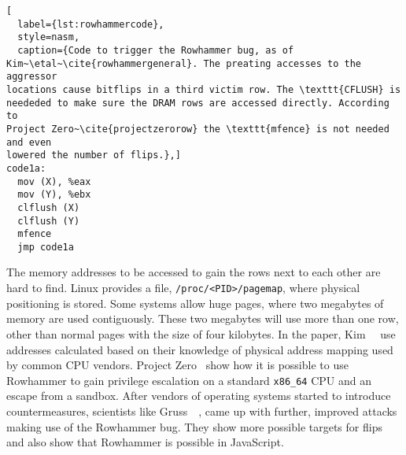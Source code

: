 \begin{minipage}{\linewidth}
\begin{lstlisting}[
  label={lst:rowhammercode},
  style=nasm,
  caption={Code to trigger the Rowhammer bug, as of
Kim~\etal~\cite{rowhammergeneral}. The preating accesses to the aggressor
locations cause bitflips in a third victim row. The \texttt{CFLUSH} is
neededed to make sure the DRAM rows are accessed directly. According to
Project Zero~\cite{projectzerorow} the \texttt{mfence} is not needed and even
lowered the number of flips.},]
code1a:
  mov (X), %eax
  mov (Y), %ebx
  clflush (X)
  clflush (Y)
  mfence
  jmp code1a
\end{lstlisting}
\end{minipage}

The memory addresses to be accessed to gain the rows next to each other are hard
to find. Linux provides a file, \texttt{/proc/<PID>/pagemap}, where physical
positioning is stored. Some systems allow huge pages, where two megabytes of
memory are used contiguously. These two megabytes will use more than one row,
other than normal pages with the size of four kilobytes. In the paper,
Kim~\etal~\cite{rowhammergeneral} use addresses calculated based on their
knowledge of physical address mapping used by common CPU vendors. Project
Zero~\cite{projectzerorow} show how it is possible to use Rowhammer to
gain privilege escalation on a standard \texttt{x86\_64} CPU and an escape from
a sandbox. After vendors of operating systems started to introduce
countermeasures, scientists like Gruss~\etal~\cite{rowhammerjs, flipinthewall},
came up with further, improved attacks making use of the Rowhammer bug. They
show more possible targets for flips and also show that Rowhammer is possible in
JavaScript.

